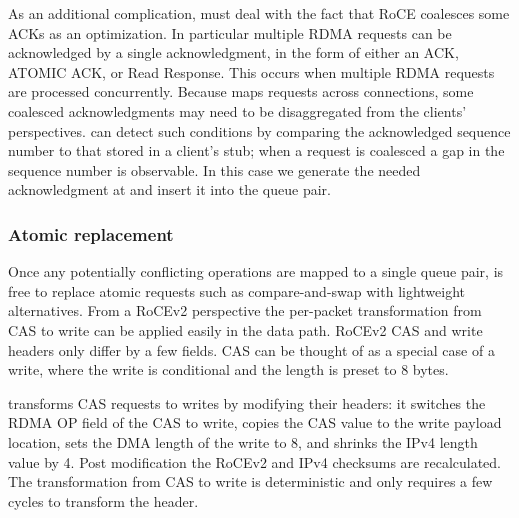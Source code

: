 As an additional complication, {\sword} must deal with the fact
that RoCE coalesces some ACKs as an optimization.  In particular
multiple RDMA requests can be acknowledged by a single
acknowledgment, in the form of either an ACK, ATOMIC ACK, or Read
Response. This occurs when multiple RDMA requests are processed
concurrently.  Because {\sword} maps requests across connections, some
coalesced acknowledgments may need to be disaggregated from the
clients' perspectives.
%
{\sword} can detect such conditions by comparing the
acknowledged sequence number to that stored in a client's stub; when a
request is coalesced a gap in the sequence number is observable. In
this case we generate the needed acknowledgment at {\sword} and
insert it into the queue pair.



\subsubsection{Atomic replacement} 

Once any potentially conflicting operations are mapped to a single
queue pair, {\sword} is free to replace atomic requests such as
compare-and-swap with lightweight alternatives.  From a RoCEv2 perspective
the per-packet transformation from CAS to write can be applied easily
in the data path.  RoCEv2 CAS and write headers only differ by a few
fields. CAS can be thought of as a special case of a write, where the
write is conditional and the length is preset to 8 bytes.

{\sword} transforms CAS requests to writes by modifying their headers: it
switches the RDMA OP field of the CAS to write, copies the CAS
value to the write payload location, sets the DMA length of the write
to 8, and shrinks the IPv4 length value by 4.  Post modification the RoCEv2
and IPv4 checksums are recalculated.
The transformation from CAS to write
is deterministic and only requires a few cycles to transform the
header.


